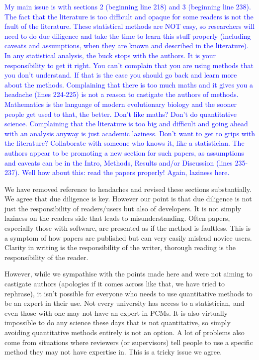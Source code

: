 \documentclass[12pt]{letter}
\begin{document}
\begin{letter}{}
\textcolor{blue}{My main issue is with sections 2 (beginning line 218) and 3 (beginning line 238). The fact that the literature is too difficult and opaque for some readers is not the fault of the literature. These statistical methods are NOT easy, so researchers will need to do due diligence and take the time to learn this stuff properly (including caveats and assumptions, when they are known and described in the literature). In any statistical analysis, the buck stops with the authors. It is your responsibility to get it right. You can't complain that you are using methods that you don't understand. If that is the case you should go back and learn more about the methods. Complaining that there is too much maths and it gives you a headache (lines 224-225) is not a reason to castigate the authors of methods. Mathematics is the language of modern evolutionary biology and the sooner people get used to that, the better. Don't like maths? Don't do quantitative science. Complaining that the literature is too big and difficult and going ahead with an analysis anyway is just academic laziness. Don't want to get to grips with the literature? Collaborate with someone who knows it, like a statistician. The authors appear to be promoting a new section for such papers, as assumptions and caveats can be in the Intro, Methods, Results and/or Discussion (lines 235-237). Well how about this: read the papers properly! Again, laziness here.}

We have removed reference to headaches and revised these sections substantially. We agree that due diligence is key. However our point is that due diligence is not just the responsibility of readers/users but also of developers. It is not simply laziness on the readers side that leads to misunderstanding. Often papers, especially those with software, are presented as if the method is faultless. This is a symptom of how papers are published but can very easily mislead novice users. Clarity in writing is the responsibility of the writer, thorough reading is the responsibility of the reader.

However, while we sympathise with the points made here and were not aiming to castigate authors (apologies if it comes across like that, we have tried to rephrase), it isn't possible for everyone who needs to use quantitative methods to be an expert in their use. Not every university has access to a statistician, and even those with one may not have an expert in PCMs. It is also virtually impossible to do any science these days that is not quantitative, so simply avoiding quantitative methods entirely is not an option. A lot of problems also come from situations where reviewers (or supervisors) tell people to use a specific method they may not have expertise in. This is a tricky issue we agree.


\end{letter}
\end{document}
